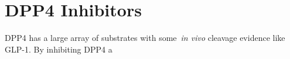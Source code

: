 \section{DPP4 Inhibitors}
DPP4 has a large array of substrates with some~\textit{in vivo} cleavage evidence like GLP-1. By inhibiting DPP4 a